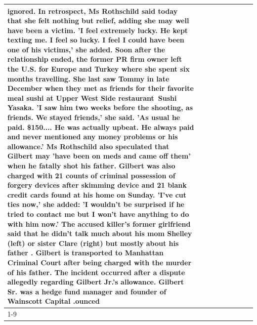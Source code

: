 \begin{table}[H]
\begin{tabular}{lllrlllll}
ignored. In retrospect, Ms Rothschild said today that she felt nothing but relief, adding she may well have been a victim. 'I feel extremely lucky. He kept texting me. I feel so lucky. I feel I could have been one of his victims,' she added. Soon after the relationship ended, the former PR firm owner left the U.S. for Europe and Turkey where she spent six months  travelling. She last saw Tommy in late December when they met as friends for their favorite meal sushi at Upper West Side restaurant Sushi Yasaka. 'I saw him two weeks before the shooting, as friends. We stayed friends,' she said. 'As usual he paid. \$150.... He was actually upbeat. He always paid and never mentioned any money problems or his allowance.' Ms Rothschild also speculated that Gilbert may 'have been on meds and came off them' when he fatally shot his father. Gilbert was also charged with 21 counts of criminal possession of forgery devices after skimming device and 21 blank credit cards found at his home on Sunday. 'I've cut ties now,' she added: 'I wouldn’t be surprised if he tried to contact me but I won’t have anything to do with him now.' The accused killer's former girlfriend said that he didn't talk much about his mom Shelley (left) or sister Clare (right) but mostly about his father . Gilbert is transported to Manhattan Criminal Court  after being charged with the murder of his father. The incident occurred after a dispute allegedly regarding Gilbert Jr.'s allowance. Gilbert Sr. was a hedge fund manager and founder of Wainscott Capital .ounced \\
\cline{1-9}

\end{tabular}
\end{table}
